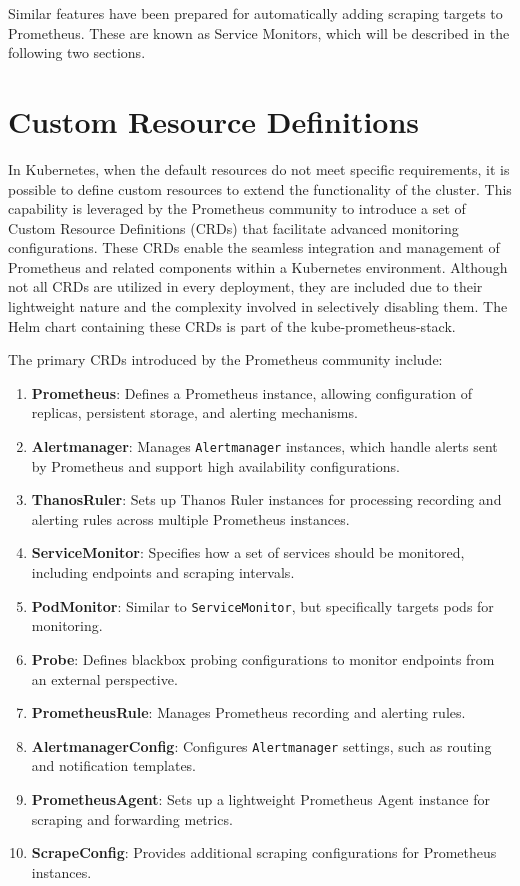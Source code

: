 Similar features have been prepared for automatically adding scraping targets to Prometheus. These are known as Service Monitors, which will be described in the following two sections.

\section{Custom Resource Definitions}
In Kubernetes, when the default resources do not meet specific requirements, it is possible to define custom resources to extend the functionality of the cluster. This capability is leveraged by the Prometheus community to introduce a set of Custom Resource Definitions (CRDs) that facilitate advanced monitoring configurations. These CRDs enable the seamless integration and management of Prometheus and related components within a Kubernetes environment. Although not all CRDs are utilized in every deployment, they are included due to their lightweight nature and the complexity involved in selectively disabling them. The Helm chart containing these CRDs is part of the kube-prometheus-stack.

The primary CRDs introduced by the Prometheus community include:

\begin{enumerate}
    \item \textbf{Prometheus}: Defines a Prometheus instance, allowing configuration of replicas, persistent storage, and alerting mechanisms.
    \item \textbf{Alertmanager}: Manages \texttt{Alertmanager} instances, which handle alerts sent by Prometheus and support high availability configurations.
    \item \textbf{ThanosRuler}: Sets up Thanos Ruler instances for processing recording and alerting rules across multiple Prometheus instances.
    \item \textbf{ServiceMonitor}: Specifies how a set of services should be monitored, including endpoints and scraping intervals.
    \item \textbf{PodMonitor}: Similar to \texttt{ServiceMonitor}, but specifically targets pods for monitoring.
    \item \textbf{Probe}: Defines blackbox probing configurations to monitor endpoints from an external perspective.
    \item \textbf{PrometheusRule}: Manages Prometheus recording and alerting rules.
    \item \textbf{AlertmanagerConfig}: Configures \texttt{Alertmanager} settings, such as routing and notification templates.
    \item \textbf{PrometheusAgent}: Sets up a lightweight Prometheus Agent instance for scraping and forwarding metrics.
    \item \textbf{ScrapeConfig}: Provides additional scraping configurations for Prometheus instances.
\end{enumerate}

